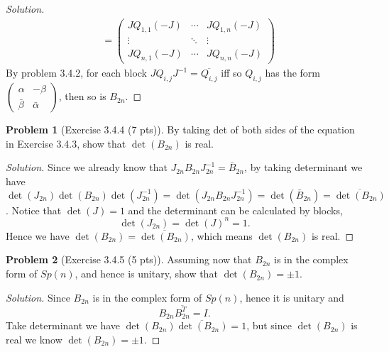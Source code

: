 \documentclass{article}
\theoremstyle{definition}
\newtheorem{problem}{Problem}
\theoremstyle{plain}
\begin{document}
\begin{adjustwidth}{0.7cm}{}
\begin{proof}[Solution]
\begin{align*}
&=\begin{pmatrix}JQ_{1,1}(-J)&\cdots&JQ_{1,n}(-J)\\ \vdots&\ddots&\vdots\\ JQ_{n,1}(-J)&\cdots&JQ_{n,n}(-J)\end{pmatrix}
\end{align*}
By problem 3.4.2, for each block $JQ_{i,j}J^{-1}=\overline{Q_{i,j}}$ iff so $Q_{i,j}$ has the form $\begin{pmatrix}\alpha&-\beta\\ \bar{\beta}&\bar{\alpha}\end{pmatrix}$, then so is $B_{2n}$.
\color{black}
\end{proof}
\end{adjustwidth}

\begin{problem}[Exercise 3.4.4 (7 pts)]By taking det of both sides of the equation in Exercise 3.4.3, show that $\det(B_{2n})$ is real.
\end{problem}
\begin{adjustwidth}{0.7cm}{}
\color{blue}
\begin{proof}[Solution]
Since we already know that $J_{2n}B_{2n}J_{2n}^{-1}=\bar{B}_{2n}$, by taking determinant we have $\det(J_{2n})\det(B_{2n})\det(J_{2n}^{-1})=\det(J_{2n}B_{2n}J_{2n}^{-1})=\det(\bar{B}_{2n})=\overline{\det(B_{2n})}$. Notice that $\det(J)=1$ and the determinant can be calculated by blocks,
\begin{displaymath}
\det(J_{2n})=\det(J)^{n}=1.
\end{displaymath}
Hence we have $\det(B_{2n})=\overline{\det(B_{2n})}$, which means $\det(B_{2n})$ is real.
\color{black}
\end{proof}
\end{adjustwidth}

\begin{problem}[Exercise 3.4.5 (5 pts)]Assuming now that $B_{2n}$ is in the complex form of $Sp(n)$, and hence is unitary, show that $\det(B_{2n})=\pm1$.
\end{problem}
\begin{adjustwidth}{0.7cm}{}
\color{blue}
\begin{proof}[Solution]Since $B_{2n}$ is in the complex form of $Sp(n)$, hence it is unitary and
\begin{displaymath}
B_{2n}\overline{B_{2n}^T}=I.
\end{displaymath}
Take determinant we have $\det(B_{2n})\overline{\det(B_{2n})}=1$, but since $\det(B_{2n})$ is real we know $\det(B_{2n})=\pm1$.
\color{black}
\end{proof}
\end{adjustwidth}
\end{document}
